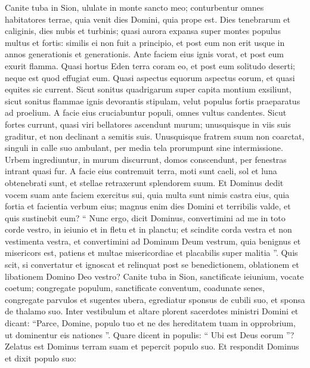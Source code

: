 \begin{biblechapter}
\begin{biblechapter}
 \verse Canite tuba in Sion,
 ululate in monte sancto meo;
 conturbentur omnes habitatores terrae,
 quia venit dies Domini,
 quia prope est.
 \verse Dies tenebrarum et caliginis,
 dies nubis et turbinis;
 quasi aurora expansa super montes
 populus multus et fortis:
 similis ei non fuit a principio,
 et post eum non erit
 usque in annos generationis et generationis.
 \verse Ante faciem eius ignis vorat,
 et post eum exurit flamma.
 Quasi hortus Eden terra coram eo,
 et post eum solitudo deserti;
 neque est quod effugiat eum.
 \verse Quasi aspectus equorum aspectus eorum,
 et quasi equites sic current.
 \verse Sicut sonitus quadrigarum
 super capita montium exsiliunt,
 sicut sonitus flammae ignis
 devorantis stipulam,
 velut populus fortis
 praeparatus ad proelium.
 \verse A facie eius cruciabuntur populi,
 omnes vultus candentes.
 \verse Sicut fortes currunt,
 quasi viri bellatores ascendunt murum;
 unusquisque in viis suis graditur,
 et non declinant a semitis suis.
 \verse Unusquisque fratrem suum non coarctat,
 singuli in calle suo ambulant,
 per media tela prorumpunt
 sine intermissione.
 \verse Urbem ingrediuntur,
 in murum discurrunt,
 domos conscendunt,
 per fenestras intrant quasi fur.
 \verse A facie eius contremuit terra,
 moti sunt caeli,
 sol et luna obtenebrati sunt,
 et stellae retraxerunt splendorem suum.
 \verse Et Dominus dedit vocem suam ante faciem exercitus sui,
 quia multa sunt nimis castra eius,
 quia fortia et facientia verbum eius;
 magnus enim dies Domini
 et terribilis valde, et quis sustinebit eum?
 \verse “ Nunc ergo,
 dicit Dominus,
 convertimini ad me in toto corde vestro,
 in ieiunio et in fletu et in planctu;
 \verse et scindite corda vestra et non vestimenta vestra,
 et convertimini ad Dominum Deum vestrum,
 quia benignus et misericors est,
 patiens et multae misericordiae
 et placabilis super malitia ”.
 \verse Quis scit, si convertatur et ignoscat
 et relinquat post se benedictionem,
 oblationem et libationem
 Domino Deo vestro?
 \verse Canite tuba in Sion,
 sanctificate ieiunium, vocate coetum;
 congregate populum, sanctificate conventum,
 coadunate senes,
 \verse congregate parvulos et sugentes ubera,
 egrediatur sponsus de cubili suo,
 et sponsa de thalamo suo.
 \verse Inter vestibulum et altare plorent
 sacerdotes ministri Domini
 et dicant: “Parce, Domine, populo tuo
 et ne des hereditatem tuam in opprobrium,
 ut dominentur eis nationes ”.
 Quare dicent in populis:
 “ Ubi est Deus eorum ”?
 \verse Zelatus est Dominus terram suam
 et pepercit populo suo.
 \verse Et respondit Dominus et dixit populo suo:

\end{biblechapter}
\end{biblechapter}
